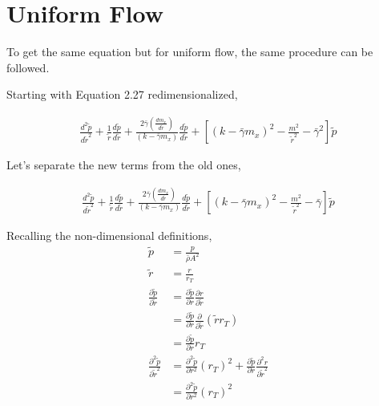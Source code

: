 \section{Uniform Flow}

To get the same equation but for uniform flow, the same procedure can be followed.

Starting with Equation 2.27 redimensionalized, 

\begin{align*}
    \frac{ d^2 \tilde{p}}{d \tilde{r}^2} +
    \frac{1}{\tilde{r}} 
    \frac{d \tilde{p}}{d \tilde{r}} + 
    \frac{2 \bar{\gamma} \left( \frac{d m_x}{d \tilde{r}} \right)}
    {\left( k - \bar{\gamma} m_x \right)}\frac{d \tilde{p}}{d \tilde{r}}+
    \left[ \left( k - \bar{\gamma} m_x \right)^2 - \frac{m^2}{\tilde{r}^2}- 
    \bar{\gamma}^2 \right] \tilde{p}
\end{align*}

Let's separate the new terms from the old ones, 

\begin{align*}
    \frac{ d^2 \tilde{p}}{d \tilde{r}^2} +
    \frac{1}{\tilde{r}} 
    \frac{d \tilde{p}}{d \tilde{r}} + 
    \frac{2 \bar{\gamma} \left( \frac{d m_x}{d \tilde{r}} \right)}
    {\left( k - \bar{\gamma} m_x \right)}\frac{d \tilde{p}}{d \tilde{r}}+
    \left[ \left( k - \bar{\gamma} m_x \right)^2 - \frac{m^2}{\tilde{r}^2}- 
    \bar{\gamma} \right] \tilde{p}
\end{align*}


Recalling the non-dimensional definitions,
\begin{align*}
    \tilde{p} &= \frac{p}{\bar{\rho} A^2} \\
    \tilde{r} &= \frac{r}{r_T} \\
    \frac{\partial \tilde{p}}{\partial \tilde{r}} &= 
    \frac{ \partial \tilde{p}}{\partial r} \frac{\partial r}{ \partial \tilde{r}}  \\ 
    &= \frac{ \partial \tilde{p}}{\partial r} \frac{\partial }{ \partial \tilde{r}} \left( \tilde{r} r_T \right) \\
    &= 
    \frac{ \partial \tilde{p}}{\partial r}  r_T \\
    \frac{\partial^2 \tilde{p}}{\partial \tilde{r}^2} &= 
    \frac{ \partial^2 \tilde{p}}{\partial r^2}  (r_T)^2+ 
    \frac{ \partial \tilde{p}}{\partial r} \frac{\partial^2 r}{ \partial \tilde{r}^2} \\
    &= \frac{ \partial^2 \tilde{p}}{\partial r^2}  (r_T)^2 
\end{align*}

